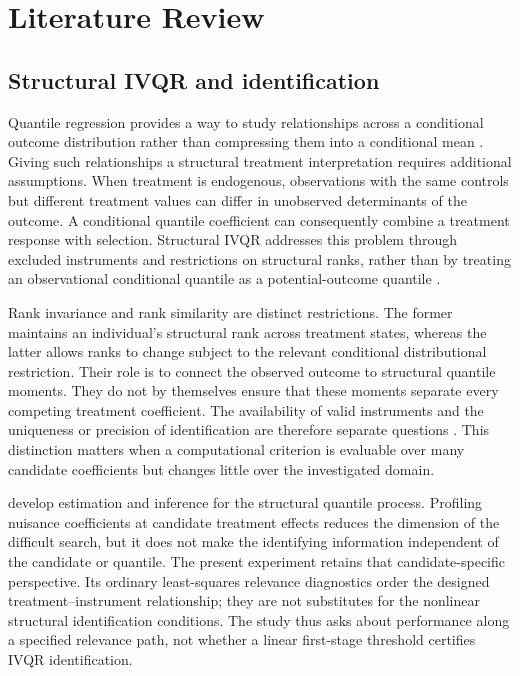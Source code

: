 \section{Literature Review}
\label{sec:literature}
\subsection{Structural IVQR and identification}
Quantile regression provides a way to study relationships across a conditional outcome distribution rather than compressing them into a conditional mean \parencite{koenker_bassett_1978}. Giving such relationships a structural treatment interpretation requires additional assumptions. When treatment is endogenous, observations with the same controls but different treatment values can differ in unobserved determinants of the outcome. A conditional quantile coefficient can consequently combine a treatment response with selection. Structural IVQR addresses this problem through excluded instruments and restrictions on structural ranks, rather than by treating an observational conditional quantile as a potential-outcome quantile \parencite{chernozhukov_hansen_2005,chernozhukov_hansen_2013}.

Rank invariance and rank similarity are distinct restrictions. The former maintains an individual's structural rank across treatment states, whereas the latter allows ranks to change subject to the relevant conditional distributional restriction. Their role is to connect the observed outcome to structural quantile moments. They do not by themselves ensure that these moments separate every competing treatment coefficient. The availability of valid instruments and the uniqueness or precision of identification are therefore separate questions \parencite{chernozhukov_hansen_2005,chernozhukov_hansen_wuthrich_2017}. This distinction matters when a computational criterion is evaluable over many candidate coefficients but changes little over the investigated domain.

\textcite{chernozhukov_hansen_2006} develop estimation and inference for the structural quantile process. Profiling nuisance coefficients at candidate treatment effects reduces the dimension of the difficult search, but it does not make the identifying information independent of the candidate or quantile. The present experiment retains that candidate-specific perspective. Its ordinary least-squares relevance diagnostics order the designed treatment--instrument relationship; they are not substitutes for the nonlinear structural identification conditions. The study thus asks about performance along a specified relevance path, not whether a linear first-stage threshold certifies IVQR identification.

